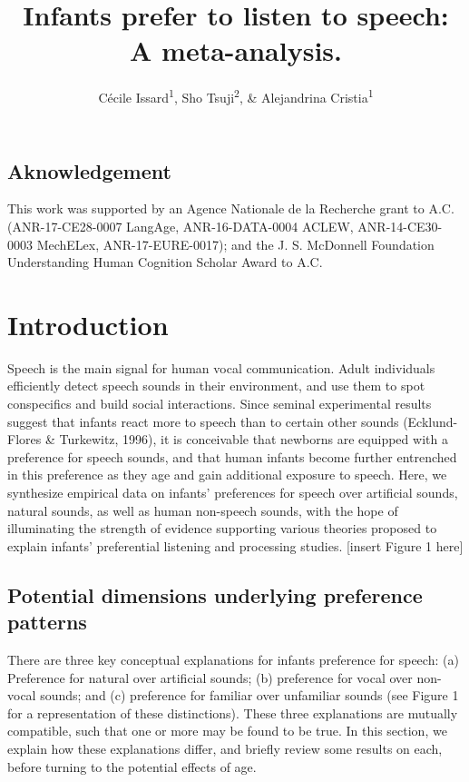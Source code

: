 \documentclass[man]{apa6}
\title{Infants prefer to listen to speech: A meta-analysis.}
\author{Cécile Issard\textsuperscript{1}, Sho Tsuji\textsuperscript{2}, \&
Alejandrina Cristia\textsuperscript{1}}
\date{}
\affiliation{
\vspace{0.5cm}
\textsuperscript{1} Laboratoire de Sciences Cognitives et Psycholinguistique, Ecole Normale Supérieure, Département d'Études Cognitives\\\textsuperscript{2} International Research Center for Neurointelligence, The University of Tokyo}
\begin{document}
\maketitle

\subsection{Aknowledgement}\label{aknowledgement}

This work was supported by an Agence Nationale de la Recherche grant to
A.C. (ANR-17-CE28-0007 LangAge, ANR-16-DATA-0004 ACLEW, ANR-14-CE30-0003
MechELex, ANR-17-EURE-0017); and the J. S. McDonnell Foundation
Understanding Human Cognition Scholar Award to A.C.

\section{Introduction}\label{introduction}

Speech is the main signal for human vocal communication. Adult
individuals efficiently detect speech sounds in their environment, and
use them to spot conspecifics and build social interactions. Since
seminal experimental results suggest that infants react more to speech
than to certain other sounds (Ecklund-Flores \& Turkewitz, 1996), it is
conceivable that newborns are equipped with a preference for speech
sounds, and that human infants become further entrenched in this
preference as they age and gain additional exposure to speech. Here, we
synthesize empirical data on infants' preferences for speech over
artificial sounds, natural sounds, as well as human non-speech sounds,
with the hope of illuminating the strength of evidence supporting
various theories proposed to explain infants' preferential listening and
processing studies. {[}insert Figure 1 here{]}

\subsection{Potential dimensions underlying preference
patterns}\label{potential-dimensions-underlying-preference-patterns}

There are three key conceptual explanations for infants preference for
speech: (a) Preference for natural over artificial sounds; (b)
preference for vocal over non-vocal sounds; and (c) preference for
familiar over unfamiliar sounds (see Figure 1 for a representation of
these distinctions). These three explanations are mutually compatible,
such that one or more may be found to be true. In this section, we
explain how these explanations differ, and briefly review some results
on each, before turning to the potential effects of age.
\end{document}
